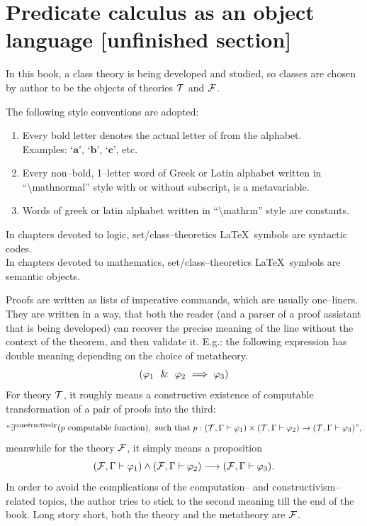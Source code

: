 \section{Predicate calculus as an object language [unfinished section]}

In this book, a class theory is being developed and studied, so classes are chosen by author to be the objects of theories $\mathcal{T}$ and ${\mathcal{F}}$.


\begin{metanotation}[styles]
The following style conventions are adopted:
\begin{enumerate}
\item Every bold letter denotes the actual letter of from the alphabet.\\
Examples: `$\pmb{a}$', `$\pmb{b}$', `$\pmb{c}$', etc.
\item Every non--bold, 1--letter word of Greek or Latin alphabet written in ``\textbackslash mathnormal'' style with or without subscript, is a metavariable.
\item Words of greek or latin alphabet written in ``\textbackslash mathrm'' style are constants.
\end{enumerate}
\end{metanotation}
\begin{metanotation}%
In chapters devoted to logic, set/class--theoretics \LaTeX\ symbols are syntactic codes.\\
In chapters devoted to mathematics, set/class--theoretics \LaTeX\ symbols are semantic objects.
\end{metanotation}
\begin{metanotation}[proofs]%
Proofs are written as lists of imperative commands, which are usually one--liners. They are written in a way, that both the reader (and a parser of a proof assistant that is being developed) can recover the precise meaning of the line without the context of the theorem, and then validate it.
E.g.: the following expression has double meaning depending on the choice of metatheory.
\[
(\varphi_1 \ \ \&\ \  \varphi_2 \ \Longrightarrow\  \varphi_3 )
\]
For theory $\mathcal{T}$, it roughly means a constructive existence of computable transformation of a pair of proofs into the third:
\[
``\exists^{\text{constructively}}(p\text{ computable function}),\text{ such that }p:(\mathcal{T},\Gamma\vdash\varphi_1)\times(\mathcal{T},\Gamma\vdash\varphi_2)\to(\mathcal{T},\Gamma\vdash\varphi_3)",
\]
meanwhile for the theory ${\mathcal{F}}$, it simply means a proposition
\[
({\mathcal{F}},\Gamma\vdash\varphi_1)
\land
({\mathcal{F}},\Gamma\vdash\varphi_2)
\longrightarrow
({\mathcal{F}},\Gamma\vdash\varphi_3).
\]
In order to avoid the complications of the computation-- and constructivism--related topics, the author tries to stick to the second meaning till the end of the book. Long story short, both the theory and the metatheory are ${\mathcal{F}}$.
\end{metanotation}
